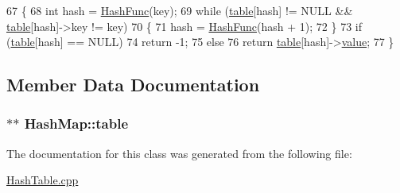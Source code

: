 \begin{DoxyCode}
67     \{
68         \textcolor{keywordtype}{int}  hash = \hyperlink{classHashMap_af676e8e12150e2f94ed7766103795f84}{HashFunc}(key);
69         \textcolor{keywordflow}{while} (\hyperlink{classHashMap_a17f8fbff625a697ac94039b4a1c6cce4}{table}[hash] != NULL && \hyperlink{classHashMap_a17f8fbff625a697ac94039b4a1c6cce4}{table}[hash]->key != key)
70         \{
71             hash = \hyperlink{classHashMap_af676e8e12150e2f94ed7766103795f84}{HashFunc}(hash + 1);
72         \}
73         \textcolor{keywordflow}{if} (\hyperlink{classHashMap_a17f8fbff625a697ac94039b4a1c6cce4}{table}[hash] == NULL)
74             \textcolor{keywordflow}{return} -1;
75         \textcolor{keywordflow}{else}
76             \textcolor{keywordflow}{return} \hyperlink{classHashMap_a17f8fbff625a697ac94039b4a1c6cce4}{table}[hash]->\hyperlink{classHashEntry_aa225f361520a57dbaf93e9d00bf69490}{value};
77         \}
\end{DoxyCode}


\subsection{Member Data Documentation}
\subsubsection[{\texorpdfstring{table}{table}}]{$\ast$$\ast$ Hash\+Map\+::table\hspace{0.3cm}{\ttfamily [private]}}\hypertarget{classHashMap_a17f8fbff625a697ac94039b4a1c6cce4}{}\label{classHashMap_a17f8fbff625a697ac94039b4a1c6cce4}


The documentation for this class was generated from the following file\+:\begin{DoxyCompactItemize}
\item 
\hyperlink{HashTable_8cpp}{Hash\+Table.\+cpp}\end{DoxyCompactItemize}
